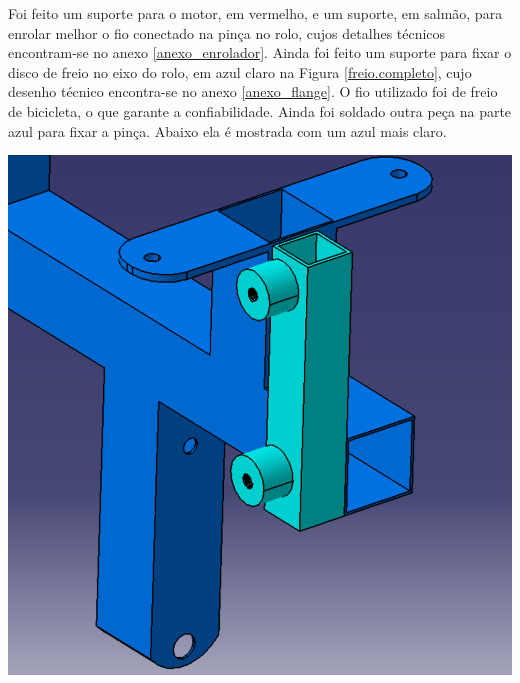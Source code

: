 
    Foi feito um suporte para o motor, em vermelho, e um suporte, em salmão, para enrolar melhor o fio conectado na pinça no rolo, cujos detalhes técnicos encontram-se no anexo \ref{anexo_enrolador}.  Ainda foi feito um suporte para fixar o disco de freio no eixo do rolo, em azul claro na Figura \ref{freio.completo}, cujo desenho técnico encontra-se no anexo \ref{anexo_flange}. O fio utilizado foi de freio de bicicleta, o que garante a confiabilidade. Ainda foi soldado outra peça na parte azul para fixar a pinça. Abaixo ela é mostrada com um azul mais claro.
    
          \begin{center}
        \includegraphics[scale=0.5]{figuras/est_fixar_pinca}
        \label{est.fixar.pinca}
    \end{center} 